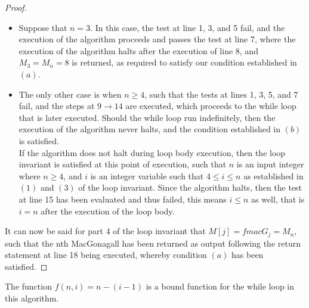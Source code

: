 \documentclass[12pt]{article}
\newenvironment{problem}[2][Problem]{\begin{trivlist}
\item[\hskip \labelsep {\bfseries #1}\hskip \labelsep {\bfseries #2.}]}{\end{trivlist}}
\begin{document}
\begin{proof}
\begin{itemize}
\item Suppose that $n = 3$. In this case, the test at line 1, 3, and 5 fail, and the execution of the algorithm proceeds and passes the test at line 7, where the execution of the algorithm halts after the execution of line 8, and $M_3 = M_n = 8$ is returned, as required to satisfy our condition established in $(a)$.

\item The only other case is when $n \geq 4$, such that the tests at lines 1, 3, 5, and 7 fail, and the steps at $9 \rightarrow 14$ are executed, which proceeds to the while loop that is later executed. Should the while loop run indefinitely, then the execution of the algorithm never halts, and the condition established in $(b)$ is satisfied. \\

If the algorithm does not halt during loop body execution, then the loop invariant is satisfied at this point of execution, such that $n$ is an input integer where $n \geq 4$, and $i$ is an integer variable such that $4 \leq i \leq n$ as established in $(1)$ and $(3)$ of the loop invariant. Since the algorithm halts, then the test at line 15 has been evaluated and thus failed, this means $i \leq n$ as well, that is $i = n$ after the execution of the loop body.

\end{itemize}

\noindent
It can now be said for part 4 of the loop invariant that $M[j] = fmacG_j = M_n$, such that the nth MacGonagall has been returned as output following the return statement at line 18 being executed, whereby condition $(a)$ has been satisfied.

\end{proof}


\begin{problem}{9}
    The function $f\left(n,i\right) = n - (i - 1)$ is a bound function for the while
    loop in this algorithm. 
\end{problem}
\end{document}
